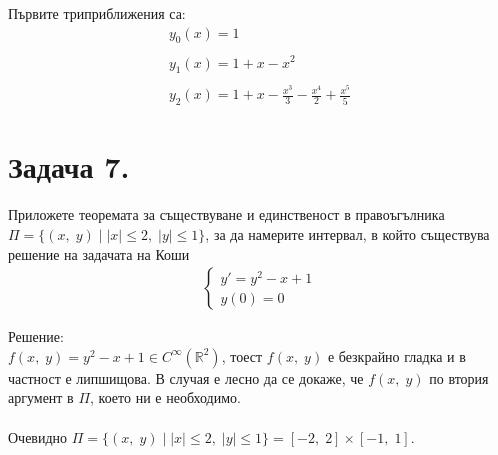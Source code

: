 \documentclass[a4paper, 12pt, oneside]{article}
\newcommand{\R}{\mathbb{R}}
\begin{document}
Първите триприближения са:
\begin{align*}
    y_0(x) = 1 \\\\
    y_1(x) = 1 + x - x^2 \\\\
    y_2(x) = 1 + x -\frac{x^3}{3} - \frac{x^4}{2} + \frac{x^5}{5}
\end{align*}

\section{Задача 7.}
Приложете теоремата за съществуване и единственост в правоъгълника \\
$\Pi = \{(x, \; y) \; | \; |x| \leq 2, \; |y| \leq 1\}$, за да намерите
интервал, в който съществува решение на задачата на Коши
\begin{align*}
    \begin{cases}
        y' = y^2 - x + 1 \\
        y(0) = 0
    \end{cases}
\end{align*}

Решение: \\

$f(x, \; y) = y^2 - x + 1 \in C^\infty(\R^2)$, тоест $f(x, \; y)$ е безкрайно гладка и в частност е липшищова.
В случая е лесно да се докаже, че $f(x, \; y)$ по втория аргумент в $\Pi$, което ни е необходимо. \\\\

Очевидно $\Pi = \{(x, \; y) \; | \; |x| \leq 2, \; |y| \leq 1\} = [-2, \; 2] \times [-1, \; 1]$. \\
\end{document}
